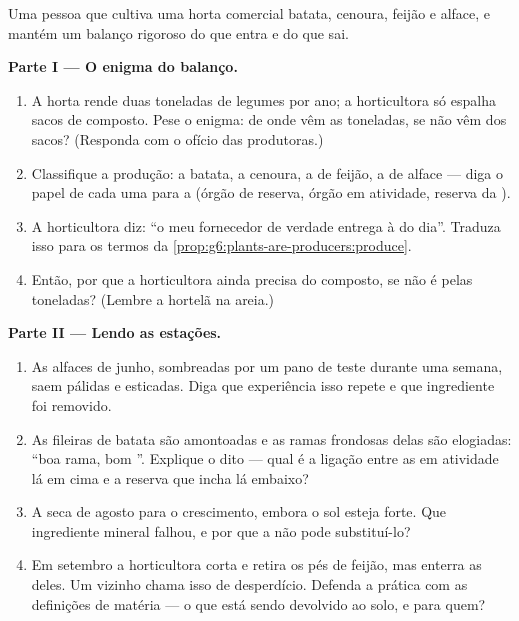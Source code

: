 \begin{problem}\label{pb:g6:plants-are-producers:1}
Uma pessoa que cultiva uma horta comercial  batata, cenoura,
feijão e alface, e mantém um balanço rigoroso do que entra e do que
sai.

\medskip\noindent\textbf{Parte I --- O enigma do balanço.}
\begin{enumerate}
  \item A horta rende duas toneladas de legumes por ano; a
        horticultora só espalha sacos de composto. Pese o enigma: de
        onde vêm as toneladas, se não vêm dos sacos? (Responda com o
        ofício das produtoras.)
  \item Classifique a produção: a batata, a cenoura, a  de
        feijão, a  de alface --- diga o papel de cada uma para a
         (órgão de reserva, órgão em atividade, reserva da
        ).
  \item A horticultora diz: ``o meu fornecedor de verdade entrega à
         do dia''. Traduza isso para os termos da
        \cref{prop:g6:plants-are-producers:produce}.
  \item Então, por que a horticultora ainda precisa do composto, se
        não é pelas toneladas? (Lembre a hortelã na areia.)
\end{enumerate}

\medskip\noindent\textbf{Parte II --- Lendo as estações.}
\begin{enumerate}[resume]
  \item As alfaces de junho, sombreadas por um pano de teste durante
        uma semana, saem pálidas e esticadas. Diga que experiência
        isso repete e que ingrediente foi removido.
  \item As fileiras de batata são amontoadas e as ramas frondosas
        delas são elogiadas: ``boa rama, bom ''. Explique o
        dito --- qual é a ligação entre as  em atividade lá em
        cima e a reserva que incha lá embaixo?
  \item A seca de agosto para o crescimento, embora o sol esteja
        forte. Que ingrediente mineral falhou, e por que a  não
        pode substituí-lo?
  \item Em setembro a horticultora corta e retira os pés de feijão,
        mas enterra as  deles. Um vizinho chama isso de
        desperdício. Defenda a prática com as definições de matéria
        --- o que está sendo devolvido ao solo, e para quem?
\end{enumerate}


\end{problem}
